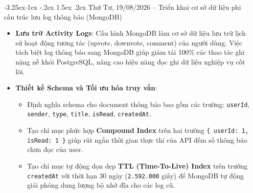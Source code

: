 \documentclass[12pt,a4paper]{article}
\makeatletter
\renewcommand\subsection{\@startsection{subsection}{2}{\z@}%
                                     {-3.25ex\@plus -1ex \@minus -.2ex}%
                                     {1.5ex \@plus .2ex}%
                                     {\normalfont\large\bfseries\color{cmcblue}}}
\makeatother
\begin{document}
\subsection{Thứ Tư, 19/08/2026 -- Triển khai cơ sở dữ liệu phi cấu trúc lưu log thông báo (MongoDB)}
\begin{itemize}
    \item \textbf{Lưu trữ Activity Logs}: Cấu hình MongoDB làm cơ sở dữ liệu lưu trữ lịch sử hoạt động tương tác (upvote, downvote, comment) của người dùng. Việc tách biệt log thông báo sang MongoDB giúp giảm tải 100\% các thao tác ghi nặng nề khỏi PostgreSQL, nâng cao hiệu năng đọc ghi dữ liệu nghiệp vụ cốt lõi.
    \item \textbf{Thiết kế Schema và Tối ưu hóa truy vấn}:
    \begin{itemize}[nosep]
        \item Định nghĩa schema cho document thông báo bao gồm các trường: \texttt{userId}, \texttt{sender}, \texttt{type}, \texttt{title}, \texttt{isRead}, \texttt{createdAt}.
        \item Tạo chỉ mục phức hợp \textbf{Compound Index} trên hai trường \texttt{\{ userId: 1, isRead: 1 \}} giúp rút ngắn thời gian thực thi của API đếm số thông báo chưa đọc của user.
        \item Tạo chỉ mục tự động dọn dẹp \textbf{TTL (Time-To-Live) Index} trên trường \texttt{createdAt} với thời hạn 30 ngày (\texttt{2.592.000} giây) để MongoDB tự động giải phóng dung lượng bộ nhớ đĩa cho các log cũ.
    \end{itemize}
\end{itemize}
\end{document}
